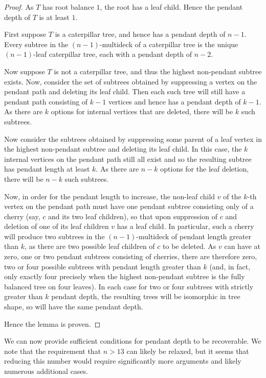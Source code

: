 \documentclass[12pt]{article}
\theoremstyle{definition}
\begin{document}
\begin{proof}
    As $T$ has root balance $1$, the root has a leaf child. Hence the pendant depth of $T$ is at least $1$.

    First suppose $T$ is a caterpillar tree, and hence has a pendant depth of $n-1$. Every subtree in the $(n-1)$-multideck of a caterpillar tree is the unique $(n-1)$-leaf caterpillar tree, each with a pendant depth of $n-2$.

    Now suppose $T$ is not a caterpillar tree, and thus the highest non-pendant subtree exists. Now, consider the set of subtrees obtained by suppressing a vertex on the pendant path and deleting its leaf child. Then each such tree will still have a pendant path consisting of $k-1$ vertices and hence has a pendant depth of $k-1$. As there are $k$ options for internal vertices that are deleted, there will be $k$ such subtrees.

    Now consider the subtrees obtained by suppressing some parent of a leaf vertex in the highest non-pendant subtree and deleting its leaf child. In this case, the $k$ internal vertices on the pendant path still all exist and so the resulting subtree has pendant length at least $k$. As there are $n-k$ options for the leaf deletion, there will be $n-k$ such subtrees.

    Now, in order for the pendant length to increase, the non-leaf child $v$ of the $k$-th vertex on the pendant path must have one pendant subtree consisting only of a cherry (say, $c$ and its two leaf children), so that upon suppression of $c$ and deletion of one of its leaf children $v$ has a leaf child. In particular, such a cherry will produce two subtrees in the $(n-1)$-multideck of pendant length greater than $k$, as there are two possible leaf children of $c$ to be deleted. As $v$ can have at zero, one or two pendant subtrees consisting of cherries, there are therefore zero, two or four possible subtrees with pendant length greater than $k$ (and, in fact, only exactly four precisely when the highest non-pendant subtree is the fully balanced tree on four leaves). In each case for two or four subtrees with strictly greater than $k$ pendant depth, the resulting trees will be isomorphic in tree shape, so will have the same pendant depth.

    Hence the lemma is proven.
\end{proof}

We can now provide sufficient conditions for pendant depth to be recoverable. We note that the requirement that $n>13$ can likely be relaxed, but it seems that reducing this number would require significantly more arguments and likely numerous additional cases.
\end{document}
